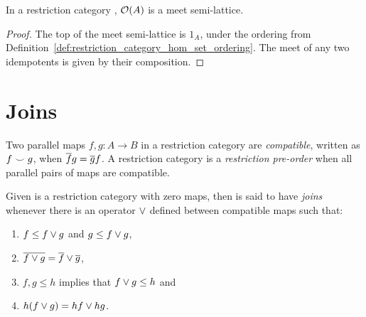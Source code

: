 \begin{lemma}\label{lem:open_a_is_a_meet_semilattice}
  In a restriction category \X, $\mathcal{O}({A})$ is a meet semi-lattice.
\end{lemma}
\begin{proof}
  The top of the meet semi-lattice is $1_A$, under the ordering from
  Definition~\ref{def:restriction_category_hom_set_ordering}.
  The meet of any two idempotents is given by their composition.
\end{proof}

\section{Joins} %
\label{sub:joins_in_restriction_categories}

\begin{definition}\label{def:compatible_maps}
  Two parallel maps $f,g:A \to B$ in a restriction category are \emph{compatible}, written as $f
  \smile g$, when $\overline{f} g = \overline{g} f$.  A restriction category \X is a \emph{restriction
    pre-order} when all parallel pairs of maps are compatible.
\end{definition}

\begin{definition}\label{def:joins}
  Given \R is a restriction category with zero maps, then \R is said to have
  \emph{joins}\cite{guox:thesis} whenever there is an operator $\vee$ defined between compatible
  maps such that:
  \begin{enumerate}[{(}i{)}]
    \item $f \le f \vee g$ and $g \le f \vee g$,\label{defitem:join1}
    \item $\overline{f\vee g} = \overline{f}\vee \overline{g}$,\label{defitem:join2}
    \item $f,g \le h$ implies that $f\vee g \le h$ and\label{defitem:join3}
    \item $h(f\vee g) = h f \vee h g$.\label{defitem:join4}
  \end{enumerate}
\end{definition}


